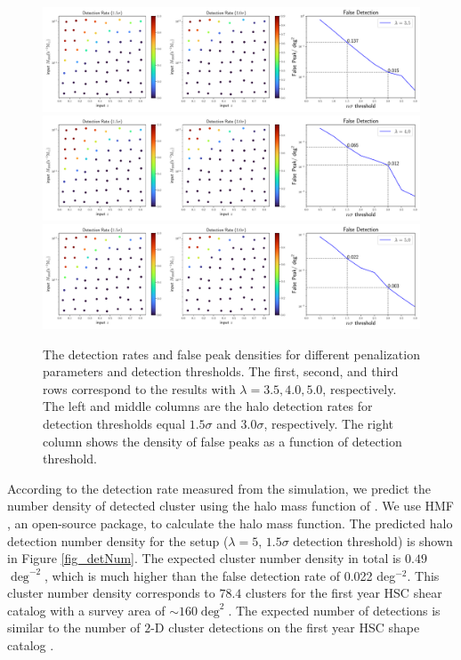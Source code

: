 \begin{figure}
 \centering
 \includegraphics[width=1.0\textwidth]{detfalse_threshold_NFW_lbd35.pdf}
 \includegraphics[width=1.0\textwidth]{detfalse_threshold_NFW_lbd40.pdf}
 \includegraphics[width=1.0\textwidth]{detfalse_threshold_NFW_lbd50.pdf}
 \caption{The detection rates and false peak densities for different
     penalization parameters and detection thresholds. The first, second, and
     third rows correspond to the results with $\lambda=3.5,4.0,5.0$,
     respectively. The left and middle columns are the halo detection rates for
     detection thresholds equal $1.5\sigma$ and $3.0\sigma$, respectively. The
     right column shows the density of false peaks as a function of detection
     threshold.
    } \label{fig_detFalsRateNFW}
\end{figure}

According to the detection rate measured from the simulation, we predict the
number density of detected cluster using the halo mass function of
\citet{haloMass-Tinker2008}. We use HMF \citep{hmf-Murray2013}, an open-source
package, to calculate the halo mass function.  The predicted halo detection
number density for the setup ($\lambda=5$, $1.5\sigma$ detection threshold) is
shown in Figure \ref{fig_detNum}. The expected cluster number density in total
is $0.49$ $\deg^{-2}$, which is much higher than the false detection rate of
0.022 deg$^{-2}$. This cluster number density corresponds to $78.4$ clusters
for the first year HSC shear catalog \citep{HSC1-catalog} with a survey area of
$\sim 160 \deg^2$.  The expected number of detections is similar to the number
of $2$-D cluster detections on the first year HSC shape catalog
\citep{HSC1-massMap-cluster}.


